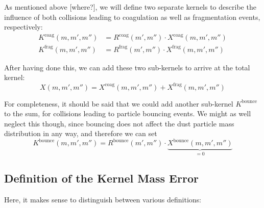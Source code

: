         As mentioned above [where?], we will define two separate kernels to describe the influence 
        of both collisions leading to coagulation as well as fragmentation events, respectively:
        \begin{align}
            K^\text{coag}(m,m',m'') &= R^\text{coag}(m',m'') \cdot X^\text{coag}(m,m',m'') \\
            K^\text{frag}(m,m',m'') &= R^\text{frag}(m',m'') \cdot X^\text{frag}(m,m',m'')
        \end{align}

        After having done this, we can add these two sub-kernels to arrive at the total kernel:
        \begin{equation}
            X(m,m',m'') = X^\text{coag}(m,m',m'') + X^\text{frag}(m,m',m'')
        \end{equation}

        For completeness, it should be said that we could add another sub-kernel 
        $K^\text{bounce}$ to the sum, for collisions leading to particle bouncing events.
        We might as well neglect this though, since bouncing does not affect the dust particle mass 
        distribution in any way, and therefore we can set
        \begin{equation}
            K^\text{bounce}(m,m',m'') 
            = R^\text{bounce}(m',m'') \cdot \underbrace{X^\text{bounce}(m,m',m'')}_{=0}
        \end{equation}

    \subsection{Definition of the Kernel Mass Error}

        Here, it makes sense to distinguish between various definitions:


